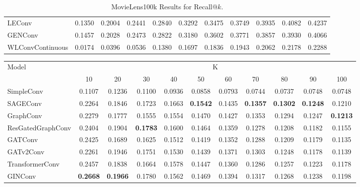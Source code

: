 \documentclass{scrartcl}
\begin{document}
\begin{appendices}
\begin{table}[htbp]
\begin{tabular}{|l|*{10}{c|}}
    \rowcolor[gray]{0.9} LEConv                   & 0.1350 & 0.2004 & 0.2441 & 0.2840 & 0.3292 & 0.3475 & 0.3749 & 0.3935 & 0.4082 & 0.4237 \\ 
    GENConv                  & 0.1457 & 0.2028 & 0.2473 & 0.2822 & 0.3180 & 0.3602 & 0.3771 & 0.3857 & 0.3930 & 0.4066 \\ 
    \rowcolor[gray]{0.9} WLConvContinuous         & 0.0174 & 0.0396 & 0.0536 & 0.1380 & 0.1697 & 0.1836 & 0.1943 & 0.2062 & 0.2178 & 0.2288 \\ \hline
    \end{tabular}
    \caption{MovieLens100k Results for Recall@$k$.}
    \label{tab:recall}
\end{table}

\begin{table}[htbp]
    \hspace{-2.3cm} 
    \begin{tabular}{|l|*{10}{c|}}
    \hline
    \multirow{2}{*}{Model} & \multicolumn{10}{c|}{K} \\
    \hhline{~*{10}{|-}|}
                             & 10    & 20    & 30    & 40    & 50    & 60    & 70    & 80    & 90    & 100   \\ \hline
    \rowcolor[gray]{0.9} SimpleConv               & 0.1107 & 0.1236 & 0.1100 & 0.0936 & 0.0858 & 0.0793 & 0.0744 & 0.0737 & 0.0748 & 0.0748 \\ 
    SAGEConv                 & 0.2264 & 0.1846 & 0.1723 & 0.1663 & \textbf{0.1542} & 0.1435 & \textbf{0.1357} & \textbf{0.1302} & \textbf{0.1248} & 0.1210 \\ 
    \rowcolor[gray]{0.9} GraphConv                & 0.2279 & 0.1777 & 0.1555 & 0.1554 & 0.1470 & 0.1427 & 0.1353 & 0.1294 & 0.1247 & \textbf{0.1213} \\ 
    ResGatedGraphConv        & 0.2404 & 0.1904 & \textbf{0.1783} & 0.1600 & 0.1464 & 0.1359 & 0.1278 & 0.1208 & 0.1182 & 0.1155 \\ 
    \rowcolor[gray]{0.9} GATConv                  & 0.2425 & 0.1689 & 0.1625 & 0.1512 & 0.1419 & 0.1352 & 0.1288 & 0.1209 & 0.1179 & 0.1135 \\ 
    GATv2Conv                & 0.2261 & 0.1946 & 0.1751 & 0.1530 & 0.1439 & 0.1371 & 0.1303 & 0.1248 & 0.1178 & 0.1139 \\ 
    \rowcolor[gray]{0.9} TransformerConv          & 0.2457 & 0.1838 & 0.1664 & 0.1578 & 0.1447 & 0.1360 & 0.1286 & 0.1257 & 0.1223 & 0.1178 \\ 
    GINConv                  & \textbf{0.2668} & \textbf{0.1966} & 0.1780 & 0.1562 & 0.1469 & 0.1394 & 0.1317 & 0.1268 & 0.1238 & 0.1198 \\ 

\end{tabular}
\end{table}
\end{appendices}
\end{document}
